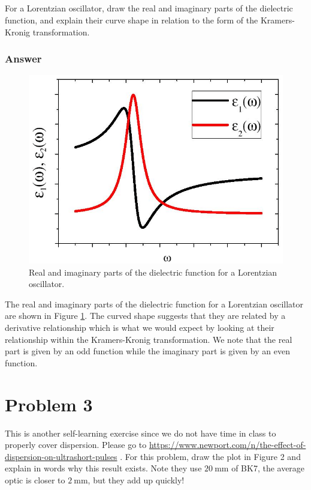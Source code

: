 \documentclass[12pt]{article}
\begin{document}
\subsection{}
For a Lorentzian oscillator, draw the real and imaginary parts of the dielectric function, and explain their curve shape in relation to the form of the Kramers-Kronig transformation.
\subsubsection{Answer}
\begin{figure}
  \centering
  \includegraphics[width=\textwidth]{dielectric_plot.png}
  \caption{Real and imaginary parts of the dielectric function for a Lorentzian oscillator.}
  \label{fig:lorentzian}
\end{figure}
The real and imaginary parts of the dielectric function for a Lorentzian oscillator are shown in Figure \ref{fig:lorentzian}. The curved shape suggests that they are related by a derivative relationship which is what we would expect by looking at their relationship within the Kramers-Kronig transformation. We note that the real part is given by an odd function while the imaginary part is given by an even function.
\section{Problem 3}



 





This is another self-learning exercise since we do not have time in class to properly cover dispersion. Please go to \href{https://www.newport.com/n/the-effect-of-dispersion-on-ultrashort-pulses}{https://www.newport.com/n/the-effect-of-dispersion-on-ultrashort-pulses} . For this problem, draw the plot in Figure 2 and explain in words why this result exists. Note they use $20 \mathrm{~mm}$ of BK7, the average optic is closer to $2 \mathrm{~mm}$, but they add up quickly!
\end{document}
